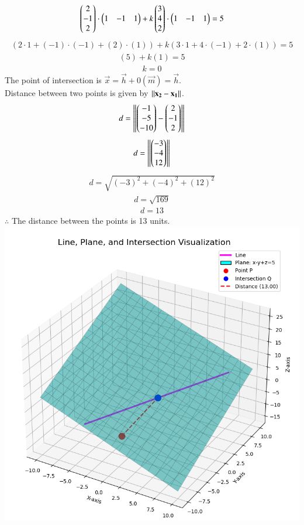 \documentclass[journal]{IEEEtran}
\begin{document}
\begin{align}
\begin{pmatrix}2\\-1\\2\end{pmatrix} \cdot \begin{pmatrix}1&-1&1\end{pmatrix} + k\begin{pmatrix}3\\4\\2\end{pmatrix} \cdot \begin{pmatrix}1&-1&1\end{pmatrix} = 5
\end{align}
\begin{align}
(2\cdot1+(-1)\cdot(-1)+(2)\cdot(1))+k(3\cdot1+4\cdot(-1)+2\cdot(1)) = 5    
\end{align}
\begin{align}
    (5)+k(1) = 5
\end{align}
\begin{align}
    k = 0
\end{align}
The point of intersection is $\vec{x} = \vec{h} + 0(\vec{m}) = \vec{h} $.
\\Distance between two points is given by 
$\left\lVert\mathbf{x_2}-\mathbf{x_1}\right\rVert$.\\
\begin{align}
    d=\left\lVert\begin{pmatrix}-1\\-5\\-10\end{pmatrix}-\begin{pmatrix}2\\-1\\2\end{pmatrix}\right\rVert
\end{align}
\begin{align}
    d=\left\lVert\begin{pmatrix}-3\\-4\\12\end{pmatrix}\right\rVert
\end{align}
\begin{align}
    d=\sqrt{(-3)^2+(-4)^2+(12)^2}
\end{align}
\begin{align}
    d=\sqrt{169}
\end{align}
\begin{align}
    d=13
\end{align}
$\therefore$ The distance between the points is 13 units.
\centering   \includegraphics[width=\columnwidth, height=\textheight, keepaspectratio]{figs/fig1.png}
\end{document}
